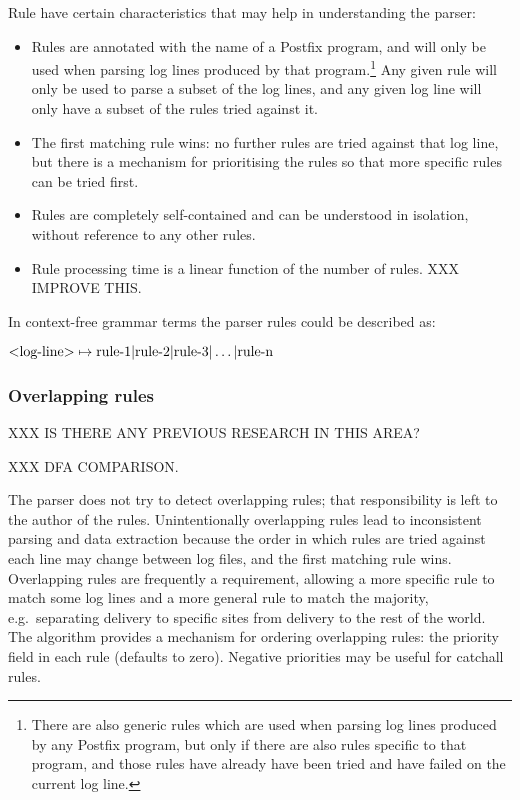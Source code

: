 \label{rule characteristics}

Rule have certain characteristics that may help in understanding the
parser:

\begin{itemize}

    \item Rules are annotated with the name of a Postfix program, and will
        only be used when parsing log lines produced by that
        program.\footnote{There are also generic rules which are used when
        parsing log lines produced by any Postfix program, but only if
        there are also rules specific to that program, and those rules have
        already have been tried and have failed on the current log line.}
        Any given rule will only be used to parse a subset of the log
        lines, and any given log line will only have a subset of the rules
        tried against it.

    \item The first matching rule wins: no further rules are tried against
        that log line, but there is a mechanism for prioritising the rules
        so that more specific rules can be tried first.

    \item Rules are completely self-contained and can be understood in
        isolation, without reference to any other rules.

    \item Rule processing time is a linear function of the number of rules.
        XXX IMPROVE THIS\@.

\end{itemize}

\label{comparison against context-free grammars}

In context-free grammar terms the parser rules could be described as:

$\text{\textless{}log-line\textgreater{}} \mapsto \text{rule-1} |
\text{rule-2} | \text{rule-3} | \dots | \text{rule-n}$


\subsubsection{Overlapping rules}

\label{overlapping rules}

XXX IS THERE ANY PREVIOUS RESEARCH IN THIS AREA\@?

XXX DFA COMPARISON\@.

The parser does not try to detect overlapping rules; that responsibility is
left to the author of the rules.  Unintentionally overlapping rules lead to
inconsistent parsing and data extraction because the order in which rules
are tried against each line may change between log files, and the first
matching rule wins.  Overlapping rules are frequently a requirement,
allowing a more specific rule to match some log lines and a more general
rule to match the majority, e.g.\ separating \SMTP{} delivery to specific
sites from \SMTP{} delivery to the rest of the world.  The algorithm
provides a mechanism for ordering overlapping rules: the priority field in
each rule (defaults to zero).  Negative priorities may be useful for
catchall rules.

